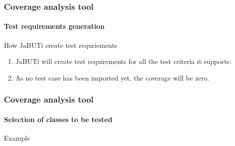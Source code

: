 \begin{frame}[parent={cmap:coverage-analysis-tool},hasnext=true,hasprev=true]
\frametitle{Coverage analysis tool}
\framesubtitle{Test requirements generation}

\begin{block:procedure}{How JaBUTi create test requriements}
\begin{enumerate}
	\item JaBUTi will create test requirements for all the test criteria it
	supports.

	\item As no test case has been imported yet, the coverage will be zero.
\end{enumerate}
\end{block:procedure}
\end{frame}



\begin{frame}
\frametitle{Coverage analysis tool}
\framesubtitle{Selection of classes to be tested}

\begin{block:ie}{Example}
\end{block:ie}
\end{frame}
